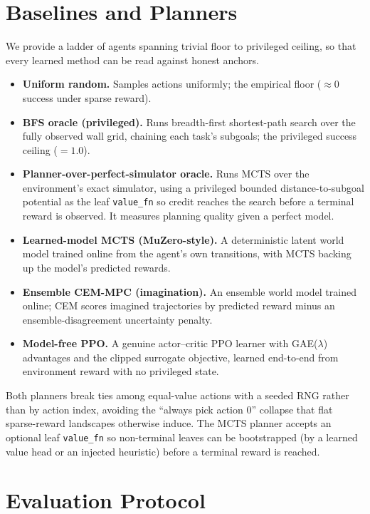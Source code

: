 \documentclass[11pt]{article}
\begin{document}
\section{Baselines and Planners}
We provide a ladder of agents spanning trivial floor to privileged ceiling, so that every learned method can be read against honest anchors.
\begin{itemize}
    \item \textbf{Uniform random.} Samples actions uniformly; the empirical floor ($\approx 0$ success under sparse reward).
    \item \textbf{BFS oracle (privileged).} Runs breadth-first shortest-path search over the fully observed wall grid, chaining each task's subgoals; the privileged success ceiling ($=1.0$).
    \item \textbf{Planner-over-perfect-simulator oracle.} Runs MCTS over the environment's exact simulator, using a privileged bounded distance-to-subgoal potential as the leaf \texttt{value\_fn} so credit reaches the search before a terminal reward is observed. It measures planning quality given a perfect model.
    \item \textbf{Learned-model MCTS (MuZero-style).} A deterministic latent world model trained online from the agent's own transitions, with MCTS backing up the model's predicted rewards.
    \item \textbf{Ensemble CEM-MPC (imagination).} An ensemble world model trained online; CEM scores imagined trajectories by predicted reward minus an ensemble-disagreement uncertainty penalty.
    \item \textbf{Model-free PPO.} A genuine actor--critic PPO learner \citep{schulman2017ppo} with GAE($\lambda$) advantages and the clipped surrogate objective, learned end-to-end from environment reward with no privileged state.
\end{itemize}
Both planners break ties among equal-value actions with a seeded RNG rather than by action index, avoiding the ``always pick action 0'' collapse that flat sparse-reward landscapes otherwise induce. The MCTS planner accepts an optional leaf \texttt{value\_fn} so non-terminal leaves can be bootstrapped (by a learned value head or an injected heuristic) before a terminal reward is reached.

\section{Evaluation Protocol}
\end{document}
